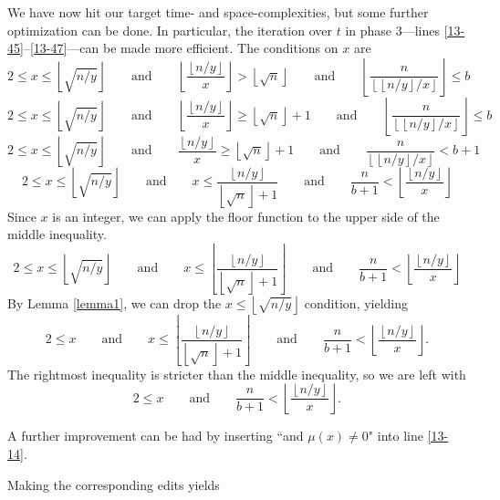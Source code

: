 \documentclass[12pt]{article}
\newcommand{\eqn}[1]{\begin{displaymath} #1 \end{displaymath}}
\newcommand{\floor}[1]{{\left\lfloor #1 \right\rfloor}}
\newcommand{\qquadtext}[1]{\qquad \text{#1} \qquad}
\newcommand{\floordiv}[2]{\floor{\frac{#1}{#2}}}
\newcommand{\isqrt}[1]{\floor{\sqrt{#1}}}
\begin{document}
We have now hit our target time- and space-complexities, but some further optimization can be done.  In particular, the iteration over $t$ in phase 3---lines \ref{13-45}--\ref{13-47}---can be made more efficient.  The conditions on $x$ are
\eqn{2 \leq x \leq \isqrt{n/y} \qquadtext{and} \floordiv{\floor{n/y}}{x} > \isqrt{n} \qquadtext{and} \floordiv{n}{\floor{\floor{n/y}/x}} \leq b}
\eqn{2 \leq x \leq \isqrt{n/y} \qquadtext{and} \floordiv{\floor{n/y}}{x} \geq \isqrt{n}+1 \qquadtext{and} \floordiv{n}{\floor{\floor{n/y}/x}} \leq b}
\eqn{2 \leq x \leq \isqrt{n/y} \qquadtext{and} \frac{\floor{n/y}}{x} \geq \isqrt{n}+1 \qquadtext{and} \frac{n}{\floor{\floor{n/y}/x}} < b+1}
\eqn{2 \leq x \leq \isqrt{n/y} \qquadtext{and} x \leq \frac{\floor{n/y}}{\isqrt{n}+1} \qquadtext{and} \frac{n}{b+1} < \floordiv{\floor{n/y}}{x}}
Since $x$ is an integer, we can apply the floor function to the upper side of the middle inequality.
\eqn{2 \leq x \leq \isqrt{n/y} \qquadtext{and} x \leq \floor{\frac{\floor{n/y}}{\isqrt{n}+1}} \qquadtext{and} \frac{n}{b+1} < \floordiv{\floor{n/y}}{x}}
By Lemma \ref{lemma1}, we can drop the $x \leq \isqrt{n/y}$ condition, yielding
\eqn{2 \leq x \qquadtext{and} x \leq \floor{\frac{\floor{n/y}}{\isqrt{n}+1}} \qquadtext{and} \frac{n}{b+1} < \floordiv{\floor{n/y}}{x}.}
The rightmost inequality is stricter than the middle inequality, so we are left with
\eqn{2 \leq x \qquadtext{and} \frac{n}{b+1} < \floordiv{\floor{n/y}}{x}.}

A further improvement can be had by inserting ``and $\mu(x) \neq 0$" into line \ref{13-14}.

Making the corresponding edits yields
\end{document}
